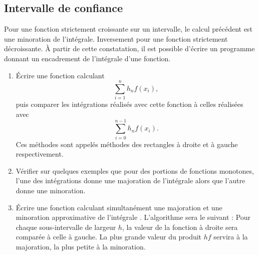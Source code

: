 \subsection{Intervalle de confiance}
Pour une fonction strictement croissante sur un intervalle, le calcul précédent
est une minoration de l'intégrale. Inversement pour une fonction strictement décroissante. À partir de cette constatation, il est possible d'écrire un programme donnant un encadrement de l'intégrale d'une fonction. 
\begin{enumerate}
\item  Écrire une fonction calculant 
 $$\sum_{i=1}^n h_n f(x_i),$$
puis comparer les intégrations réalisés avec cette fonction à celles réalisées avec 
$$\sum_{i=0}^{n-1}h_n f(x_i).$$
Ces méthodes sont appelés méthodes des rectangles à droite et à gauche respectivement.
\item Vérifier sur quelques exemples que pour des portions de fonctions monotones, l'une des intégrations donne une majoration de l'intégrale alors que l'autre donne une minoration. 
\item Écrire une fonction calculant simultanément 
une majoration et une minoration approximative de 
l'intégrale . L'algorithme sera le suivant : 
Pour chaque sous-intervalle de largeur $h$, 
la valeur de la fonction à droite sera comparée à celle à gauche. 
La plus grande valeur du produit $hf$ servira à la majoration, 
la plus petite à la minoration.
\end{enumerate}

